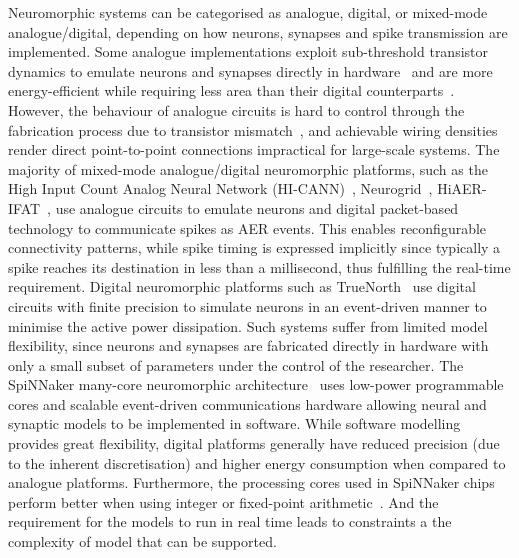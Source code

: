 \documentclass{frontiersENG} %
\begin{document}
Neuromorphic systems can be categorised as analogue, digital, or mixed-mode analogue/digital, depending on how neurons, synapses and spike transmission are implemented. %
Some analogue implementations exploit sub-threshold transistor dynamics to emulate neurons and synapses directly in hardware~\citep{indiveri2011neuromorphic} and are more energy-efficient while requiring less area than their digital counterparts~\citep{joubert2012hardware}. However, the behaviour of analogue circuits is hard to control through the fabrication process due to transistor mismatch~\citep{indiveri2011neuromorphic,pedram2006thermal,linares2003compact}, and achievable wiring densities render direct point-to-point connections impractical for large-scale systems. The majority of mixed-mode analogue/digital neuromorphic platforms, such as the High Input Count Analog Neural Network (HI-CANN)~\citep{schemmel2010wafer}, Neurogrid~\citep{benjamin2014neurogrid}, HiAER-IFAT~\citep{yu201265k}, use analogue circuits to emulate neurons and digital packet-based technology to communicate spikes as AER events. This enables reconfigurable connectivity patterns, while spike timing is expressed implicitly since typically a spike reaches its destination in less than a millisecond, thus fulfilling the real-time requirement. Digital neuromorphic platforms such as TrueNorth~\citep{merolla2014million} use digital circuits with finite precision to simulate neurons in an event-driven manner to minimise the active power dissipation. Such systems suffer from limited model flexibility, since neurons and synapses are fabricated directly in hardware with only a small subset of parameters under the control of the researcher. 
The SpiNNaker many-core neuromorphic architecture~\citep{furber2014spinnaker} uses low-power programmable cores and scalable event-driven communications hardware allowing neural and synaptic models to be implemented in software.
While software modelling provides great flexibility, digital platforms generally have reduced precision (due to the inherent discretisation) and higher energy consumption when compared to analogue platforms. Furthermore, the processing cores used in SpiNNaker chips perform better when using integer or fixed-point arithmetic~\citep{Hopkins2015Accuracy}.
And the requirement for the models to run in real time leads to constraints a the complexity of model that can be supported.
\end{document}
